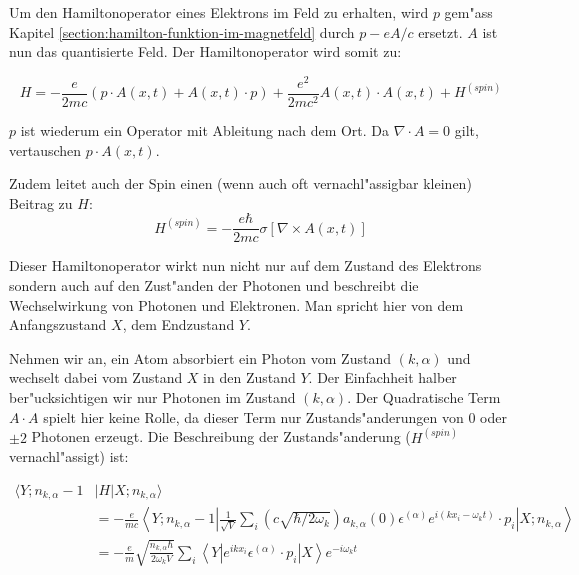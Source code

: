 Um den Hamiltonoperator eines Elektrons im Feld zu erhalten, wird $p$ gem"ass Kapitel \ref{section:hamilton-funktion-im-magnetfeld} durch $p -eA/c$ ersetzt. $A$ ist nun das quantisierte Feld. Der Hamiltonoperator wird somit zu:

\begin{equation}
H = -\frac{e}{2mc}(p \cdot A(x, t) + A(x, t) \cdot p) + \frac{e^2}{2mc^2}A(x, t) \cdot A(x, t) + H^{(spin)}
\end{equation}

$p$ ist wiederum ein Operator mit Ableitung nach dem Ort. Da $\nabla \cdot A = 0$ gilt, vertauschen $p \cdot A(x, t)$.

Zudem leitet auch der Spin einen (wenn auch oft vernachl"assigbar kleinen) Beitrag zu $H$:
\begin{equation}
H^{(spin)} = - \frac{e \hbar}{2mc}\sigma \left[\nabla \times A(x, t)\right]
\end{equation}

Dieser Hamiltonoperator wirkt nun nicht nur auf dem Zustand des Elektrons sondern auch auf den Zust"anden der Photonen und beschreibt die Wechselwirkung von Photonen und Elektronen. Man spricht hier von dem Anfangszustand $X$, dem Endzustand $Y$.

Nehmen wir an, ein Atom absorbiert ein Photon vom Zustand $(k,\alpha)$ und wechselt dabei vom Zustand $X$ in den Zustand $Y$. Der Einfachheit halber ber"ucksichtigen wir nur Photonen im Zustand $(k,\alpha)$. Der Quadratische Term $A \cdot A$ spielt hier keine Rolle, da dieser Term nur Zustands"anderungen von $0$ oder $\pm 2$ Photonen erzeugt. Die Beschreibung der Zustands"anderung ($H^{(spin)}$ vernachl"assigt) ist:

\begin{equation}
\begin{split}
\langle Y; n_{k,\alpha} - 1 &| H | X; n_{k,\alpha} \rangle \\
&= -\frac{e}{mc} \left\langle Y; n_{k,\alpha} - 1 \left| 
\frac{1}{\sqrt{V}} \sum_i \left(c \sqrt{\hbar/2 \omega_k}\right)a_{k,\alpha}(0) \epsilon^{(\alpha)} e^{i(kx_i-\omega_k t)} \cdot p_i 
\right| X; n_{k,\alpha} \right\rangle\\
&= -\frac{e}{m} \sqrt{\frac{n_{k,\alpha} \hbar}{2 \omega_k V}} \sum_i \left\langle Y \left| 
e^{ikx_i} \epsilon^{(\alpha)} \cdot p_i 
\right| X \right\rangle e^{-i\omega_k t}
\end{split}
\end{equation}

